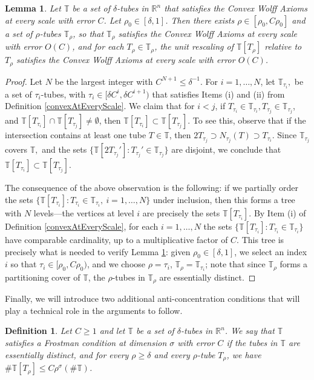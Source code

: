 \documentclass[letterpaper, reqno,11pt]{article}
\numberwithin{equation}{section}
\newcommand{\RR}{\mathbb{R}}
\newcommand{\tubes}{\mathbb{T}}
\numberwithin{thm}{section}
\newtheorem{defn}[thm]{Definition}
\newtheorem{lem}[thm]{Lemma}
\theoremstyle{remark}
\begin{document}
\begin{lem}\label{multiScaleWolffLem}
Let $\tubes$ be a set of $\delta$-tubes in $\RR^n$ that satisfies the Convex Wolff Axioms at every scale with error $C$. Let $\rho_0\in[\delta,1]$. Then there exists $\rho\in [\rho_0, C\rho_0]$ and a set of $\rho$-tubes $\tubes_\rho$, so that $\tubes_\rho$ satisfies the Convex Wolff Axioms at every scale with error $O(C)$, and for each $T_\rho\in\tubes_\rho$, the unit rescaling of $\tubes[T_\rho]$ relative to $T_\rho$ satisfies the Convex Wolff Axioms at every scale with error $O(C)$.
\end{lem}
\begin{proof}
Let $N$ be the largest integer with $C^{N+1}\leq\delta^{-1}$. For $i=1,\ldots, N$, let $\tubes_{\tau_i},$ be a set of $\tau_i$-tubes, with $\tau_i\in [\delta C^i, \delta C^{i+1})$ that satisfies Items (i) and (ii) from Definition \ref{convexAtEveryScale}.  We claim that for $i<j$, if $T_{\tau_i}\in \tubes_{\tau_i}, T_{\tau_j}\in \tubes_{\tau_j}$, and $\tubes[T_{\tau_i}]\cap \tubes[T_{\tau_j}]\neq\emptyset$, then $\tubes[T_{\tau_i}]\subset\tubes[T_{\tau_j}]$. To see this, observe that if the intersection contains at least one tube $T\in\tubes$, then $2T_{\tau_j}\supset N_{\tau_j}(T) \supset T_{\tau_i}$. Since $\tubes_{\tau_j}$ covers $\tubes,$ and the sets $\{\tubes[2T_{\tau_j}']\colon T_{\tau_j}'\in\tubes_{\tau_j}\}$ are disjoint, we conclude that $\tubes[T_{\tau_i}]\subset\tubes[T_{\tau_j}]$. 

The consequence of the above observation is the following: if we partially order the sets $\{\tubes[T_{\tau_i}]\colon T_{\tau_i}\in\tubes_{\tau_i},\ i=1,\ldots,N\}$ under inclusion, then this forms a tree with $N$ levels---the vertices at level $i$ are precisely the sets $\tubes[T_{\tau_i}]$. By Item (i) of Definition \ref{convexAtEveryScale}, for each $i=1,\ldots,N$ the sets $\{\tubes[T_{\tau_i}]\colon T_{\tau_i}\in\tubes_{\tau_i}\}$ have comparable cardinality, up to a multiplicative factor of $C$. This tree is precisely what is needed to verify Lemma \ref{multiScaleWolffLem}: given $\rho_0\in[\delta,1]$, we select an index $i$ so that $\tau_i\in[\rho_0, C\rho_0)$, and we choose $\rho=\tau_i$, $\tubes_\rho=\tubes_{\tau_i}$; note that since $\tubes_\rho$ forms a partitioning cover of $\tubes$, the $\rho$-tubes in $\tubes_\rho$ are essentially distinct.
\end{proof}


Finally, we will introduce two additional anti-concentration conditions that will play a technical role in the arguments to follow. 
\begin{defn}
Let $C\geq 1$ and let $\tubes$ be a set of $\delta$-tubes in $\RR^n$. We say that $\tubes$ satisfies a \emph{Frostman condition at dimension $\sigma$ with error $C$} if the tubes in $\tubes$ are essentially distinct, and for every $\rho\geq\delta$ and every $\rho$-tube $T_\rho$, we have $\#\tubes[T_\rho]\leq C\rho^\sigma(\#\tubes)$.
\end{defn}
\end{document}
